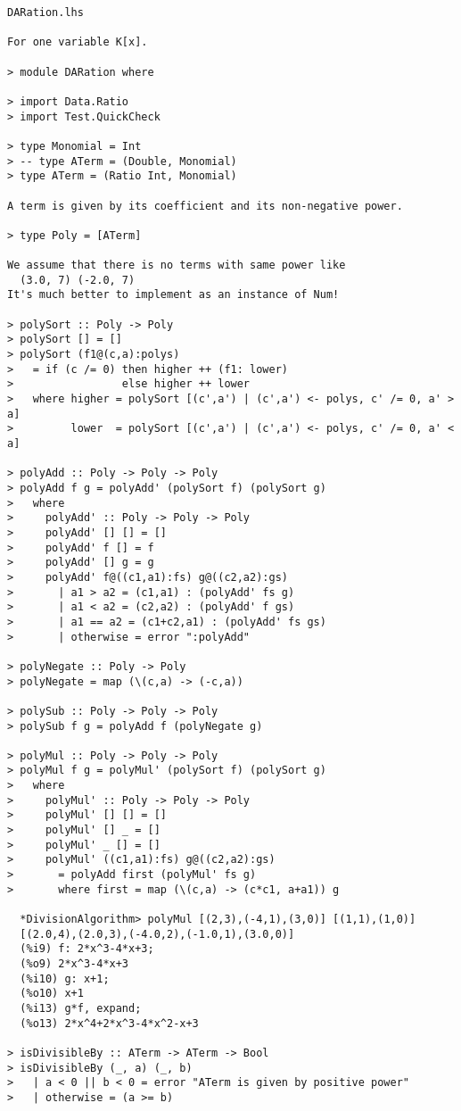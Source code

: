 \documentclass[11pt]{book}
\begin{document}
\begin{verbatim}
DARation.lhs

For one variable K[x].

> module DARation where

> import Data.Ratio 
> import Test.QuickCheck

> type Monomial = Int
> -- type ATerm = (Double, Monomial)
> type ATerm = (Ratio Int, Monomial)

A term is given by its coefficient and its non-negative power.

> type Poly = [ATerm]

We assume that there is no terms with same power like
  (3.0, 7) (-2.0, 7)
It's much better to implement as an instance of Num!

> polySort :: Poly -> Poly
> polySort [] = []
> polySort (f1@(c,a):polys) 
>   = if (c /= 0) then higher ++ (f1: lower)
>                 else higher ++ lower
>   where higher = polySort [(c',a') | (c',a') <- polys, c' /= 0, a' > a]
>         lower  = polySort [(c',a') | (c',a') <- polys, c' /= 0, a' < a]

> polyAdd :: Poly -> Poly -> Poly
> polyAdd f g = polyAdd' (polySort f) (polySort g) 
>   where 
>     polyAdd' :: Poly -> Poly -> Poly
>     polyAdd' [] [] = []
>     polyAdd' f [] = f
>     polyAdd' [] g = g
>     polyAdd' f@((c1,a1):fs) g@((c2,a2):gs) 
>       | a1 > a2 = (c1,a1) : (polyAdd' fs g)
>       | a1 < a2 = (c2,a2) : (polyAdd' f gs)
>       | a1 == a2 = (c1+c2,a1) : (polyAdd' fs gs)
>       | otherwise = error ":polyAdd"

> polyNegate :: Poly -> Poly
> polyNegate = map (\(c,a) -> (-c,a))

> polySub :: Poly -> Poly -> Poly
> polySub f g = polyAdd f (polyNegate g)

> polyMul :: Poly -> Poly -> Poly
> polyMul f g = polyMul' (polySort f) (polySort g)
>   where 
>     polyMul' :: Poly -> Poly -> Poly
>     polyMul' [] [] = []
>     polyMul' [] _ = []
>     polyMul' _ [] = []
>     polyMul' ((c1,a1):fs) g@((c2,a2):gs) 
>       = polyAdd first (polyMul' fs g)
>       where first = map (\(c,a) -> (c*c1, a+a1)) g

  *DivisionAlgorithm> polyMul [(2,3),(-4,1),(3,0)] [(1,1),(1,0)]
  [(2.0,4),(2.0,3),(-4.0,2),(-1.0,1),(3.0,0)]
  (%i9) f: 2*x^3-4*x+3;
  (%o9) 2*x^3-4*x+3
  (%i10) g: x+1;
  (%o10) x+1
  (%i13) g*f, expand;
  (%o13) 2*x^4+2*x^3-4*x^2-x+3

> isDivisibleBy :: ATerm -> ATerm -> Bool
> isDivisibleBy (_, a) (_, b) 
>   | a < 0 || b < 0 = error "ATerm is given by positive power"
>   | otherwise = (a >= b)


\end{verbatim}
\end{document}
